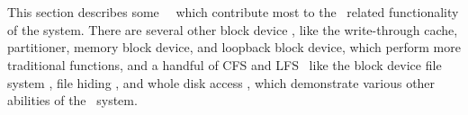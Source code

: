 \section{\Modules}
\label{sec:modules}


This section describes some \Kudos\ \modules\ which contribute most to
the \chdesc\ related functionality of the system. There are several other
block device \modules, like the write-through cache, partitioner, memory
block device, and loopback block device, which perform more traditional
functions, and a handful of CFS and LFS \modules\ like the block device
file system \module, file hiding \module, and whole disk access \module,
which demonstrate various other abilities of the \module\ system.




